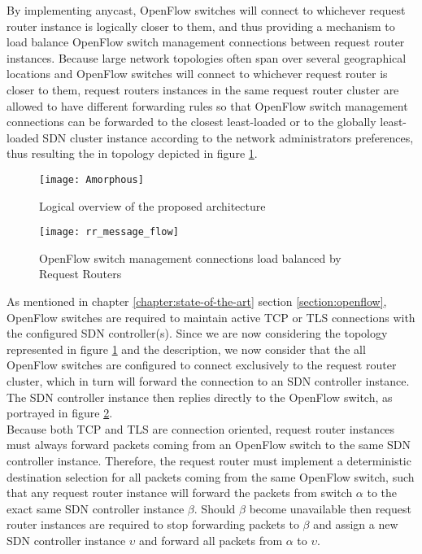 By implementing \gls{anycast}, OpenFlow switches will connect to whichever request router instance is logically closer to them, and thus providing a mechanism to load balance OpenFlow switch management connections between request router instances.
Because large network topologies often span over several geographical locations and OpenFlow switches will connect to whichever request router is closer to them, request routers instances in the same request router cluster are allowed to have different forwarding rules so that OpenFlow switch management connections can be forwarded to the closest least-loaded or to the globally least-loaded \gls{SDN} cluster instance according to the network administrators preferences, thus resulting the in topology depicted in figure \ref{fig:Amorphous}.\\
%
\begin{figure}
	\centering
	\texttt{[image: Amorphous]}
	\caption{Logical overview of the proposed architecture}
	\label{fig:Amorphous}
\end{figure}
%
%
\begin{figure}
	\centering
	\texttt{[image: rr\_message\_flow]}
	\caption{OpenFlow switch management connections load balanced by Request Routers}
	\label{fig:rr_message_flow}
\end{figure}
%
As mentioned in chapter \ref*{chapter:state-of-the-art} section \ref{section:openflow}, OpenFlow switches are required to maintain active \gls{TCP} or \gls{TLS} connections with the configured \gls{SDN} controller(s).
Since we are now considering the topology represented in figure \ref{fig:Amorphous} and the description, we now consider that the all OpenFlow switches are configured to connect exclusively to the request router cluster, which in turn will forward the connection to an \gls{SDN} controller instance.
The \gls{SDN} controller instance then replies directly to the OpenFlow switch, as portrayed in figure \ref{fig:rr_message_flow}.\\
Because both \gls{TCP} and \gls{TLS} are connection oriented, request router instances must always forward packets coming from an OpenFlow switch to the same \gls{SDN} controller instance.
Therefore, the request router must implement a deterministic destination selection for all packets coming from the same OpenFlow switch, such that any request router instance will forward the packets from switch $\alpha$ to the exact same \gls{SDN} controller instance $\beta$.
Should $\beta$ become unavailable then request router instances are required to stop forwarding packets to $\beta$ and assign a new \gls{SDN} controller instance $\upsilon$ and forward all packets from $\alpha$ to $\upsilon$.

